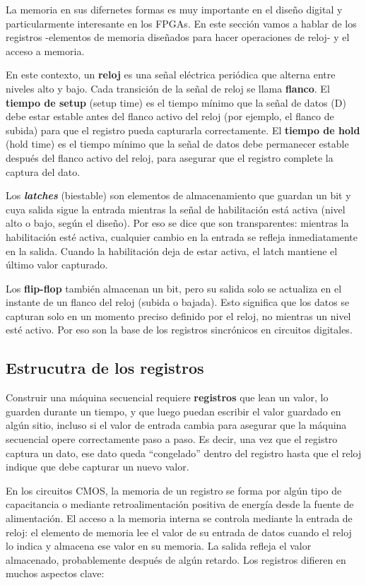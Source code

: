 La memoria en sus difernetes formas es muy importante en el diseño digital y particularmente interesante en los FPGAs. En este sección vamos a hablar de los registros -elementos de memoria diseñados para hacer operaciones de reloj- y el acceso a memoria.  

En este contexto, un \textbf{reloj} es una señal eléctrica periódica que alterna entre niveles alto y bajo.  Cada transición de la señal de reloj se llama \textbf{flanco}. El \textbf{tiempo de setup} (setup time) es el tiempo mínimo que la señal de datos (D) debe estar estable antes del flanco activo del reloj (por ejemplo, el flanco de subida) para que el registro pueda capturarla correctamente. El \textbf{tiempo de hold} (hold time) es el tiempo mínimo que la señal de datos debe permanecer estable después del flanco activo del reloj, para asegurar que el registro complete la captura del dato.

Los \textbf{\textit{latches}} (biestable) son elementos de almacenamiento que guardan un bit y cuya salida sigue la entrada mientras la señal de habilitación está activa (nivel alto o bajo, según el diseño). Por eso se dice que son transparentes: mientras la habilitación esté activa, cualquier cambio en la entrada se refleja inmediatamente en la salida. Cuando la habilitación deja de estar activa, el latch mantiene el último valor capturado.

Los \textbf{flip-flop} también almacenan un bit, pero su salida solo se actualiza en el instante de un flanco del reloj (subida o bajada). Esto significa que los datos se capturan solo en un momento preciso definido por el reloj, no mientras un nivel esté activo. Por eso son la base de los registros sincrónicos en circuitos digitales.

\subsection{Estrucutra de los registros}

Construir una máquina secuencial requiere \textbf{registros} que lean un valor, lo guarden durante un tiempo, y que luego puedan escribir  el valor guardado en algún sitio, incluso si el valor de entrada cambia  para asegurar que la máquina secuencial opere correctamente paso a paso. Es decir, una vez que el registro captura un dato, ese dato queda “congelado” dentro del registro hasta que el reloj indique que debe capturar un nuevo valor. 


En los circuitos CMOS, la memoria de un registro se forma por algún tipo de capacitancia o mediante retroalimentación positiva de energía desde la fuente de alimentación. El acceso a la memoria interna se controla mediante la entrada de reloj: el elemento de memoria lee el valor de su entrada de datos cuando el reloj lo indica y almacena ese valor en su memoria. La salida refleja el valor almacenado, probablemente después de algún retardo. Los registros difieren en muchos aspectos clave:

